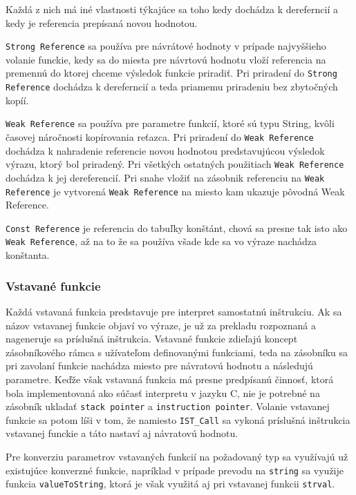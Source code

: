 \documentclass[12pt,a4paper,titlepage,final]{article}
\begin{document}
Každá z nich má iné vlastnosti týkajúce sa toho kedy dochádza k dereferncií a kedy
je referencia prepísaná novou hodnotou.

\texttt{Strong Reference} sa používa pre návrátové hodnoty v prípade najvyššieho volanie funckie,
kedy sa do miesta pre návrtovú hodnotu vloží referencia na premennú do ktorej chceme
výsledok funkcie priradiť. Pri priradení do \texttt{Strong Reference} dochádza k dereferncií a teda
priamemu priradeniu bez zbytočných kopíí.

\texttt{Weak Reference} sa používa pre parametre funkcií, ktoré sú typu String, kvôli časovej náročnosti
kopírovania reťazca. Pri priradení do \texttt{Weak Reference} dochádza k nahradenie referencie
novou hodnotou predstavujúcou výsledok výrazu, ktorý bol priradený. Pri všetkých ostatných použitiach
\texttt{Weak Reference} dochádza k jej dereferencií. Pri snahe vložiť na zásobnik referenciu na \texttt{Weak Reference}
je vytvorená \texttt{Weak Reference} na miesto kam ukazuje pôvodná Weak Reference.

\texttt{Const Reference} je referencia do tabuľky konštánt, chová sa presne tak isto ako \texttt{Weak Reference},
až na to že sa používa všade kde sa vo výraze nachádza konštanta.

\subsubsection{Vstavané funkcie}
Každá vstavaná funkcia predstavuje pre interpret samostatnú inštrukciu. Ak sa
názov vstavanej funkcie objaví vo výraze, je už za prekladu rozpoznaná a 
nageneruje sa príslušná inštrukcia. Vstavané funkcie zdieľajú koncept zásobníkového
rámca s užívateľom definovanými funkciami, teda na zásobníku sa pri zavolaní funkcie 
nachádza miesto pre návratovú hodnotu a následujú parametre. Keďže však vstavaná funkcia
má presne predpísanú činnosť, ktorá bola implementovaná ako súčasť interpretu v jazyku C,
nie je potrebné na zásobník ukladať \texttt{stack pointer} a \texttt{instruction pointer}.
Volanie vstavanej funkcie sa potom líši v tom, že namiesto \texttt{IST\_Call} sa vykoná 
príslušná inštrukcia vstavanej funckie a táto nastaví aj návratovú hodnotu.

Pre konverziu parametrov vstavaných funkcií na požadovaný typ sa využívajú už existujúce
konverzné funkcie, napríklad v prípade prevodu na \texttt{string} sa využije funkcia
\texttt{valueToString}, ktorá je však využitá aj pri vstavanej funkcii \texttt{strval}.
\end{document}
